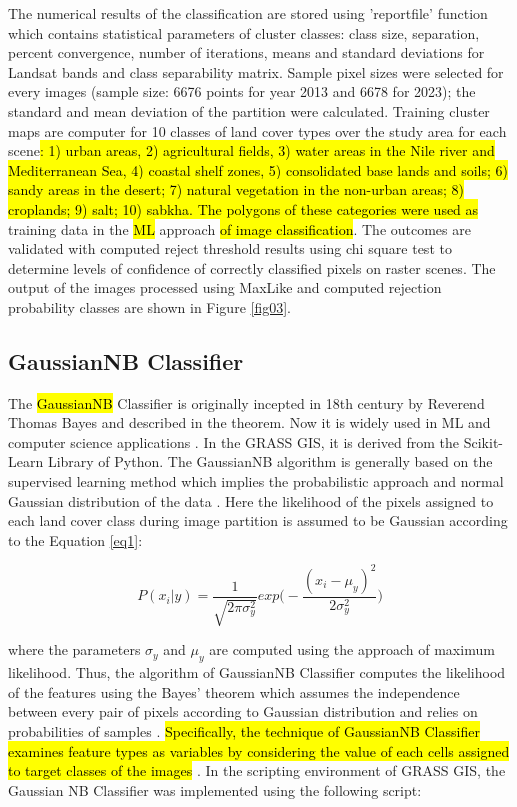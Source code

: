\documentclass[final,5p,times,twocolumn]{elsarticle}
\numberwithin{table}{section}
\begin{document}
The numerical results of the classification are stored using 'reportfile' function which contains statistical parameters of cluster classes: class size, separation, percent convergence, number of iterations, means and standard deviations for Landsat bands and class separability matrix. Sample pixel sizes were selected for every images (sample size: 6676 points for year 2013 and 6678 for 2023); the standard and mean deviation of the partition were calculated. Training cluster maps are computer for 10 classes of land cover types over the study area for each scene\hl{: 1) urban areas, 2) agricultural fields, 3) water areas in the Nile river and Mediterranean Sea, 4) coastal shelf zones, 5) consolidated base lands and soils; 6) sandy areas in the desert; 7) natural vegetation in the non-urban areas; 8) croplands; 9) salt; 10) sabkha. The polygons of these categories were used as} training data in the \hl{ML} approach \hl{of image classification}. The outcomes are validated with computed reject threshold results using chi square test to determine levels of confidence of correctly classified pixels on raster scenes. The output of the images processed using MaxLike and computed rejection probability classes are shown in Figure \ref{fig03}.

\subsection{GaussianNB Classifier}

The \hl{GaussianNB} Classifier is originally incepted in 18th century by Reverend Thomas Bayes and described in the theorem. Now it is widely used in ML and computer science applications \cite{Chanetal1982}. In the GRASS GIS, it is derived from the Scikit-Learn Library of Python. The GaussianNB algorithm is generally based on the supervised learning method which implies the probabilistic approach and normal Gaussian distribution of the data \cite{BERRAR2019403}. Here the likelihood of the pixels assigned to each land cover class during image partition is assumed to be Gaussian according to the Equation \ref{eq1}:

\begin{equation}
P(x_{i} | y)=\frac{1}{\sqrt{2\pi\sigma^2_y}}exp\biggl( -\frac{(x_{i}-\mu_{y})^2}{2\sigma^2_y}\biggr)
\label{eq1}
\end{equation}

where the parameters $\sigma_y$ and $\mu_y$  are computed using the approach of maximum likelihood. Thus, the algorithm of GaussianNB Classifier computes the likelihood of the features using the Bayes' theorem which assumes the independence between every pair of pixels according to Gaussian distribution and relies on probabilities of samples \cite{PERETZ2024108972}. \hl{Specifically, the technique of GaussianNB Classifier examines feature types as variables by considering the value of each cells assigned to target classes of the images} \cite{5655540}. In the scripting environment of GRASS GIS, the Gaussian NB Classifier was implemented using the following script:
\end{document}
